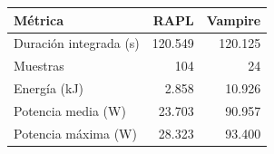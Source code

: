 \begin{tabular}{lrr}
\hline
Métrica & RAPL & Vampire \\
\hline
Duración integrada (s) & 120.549 & 120.125 \\
Muestras & 104 & 24 \\
Energía (kJ) & 2.858 & 10.926 \\
Potencia media (W) & 23.703 & 90.957 \\
Potencia máxima (W) & 28.323 & 93.400 \\
\hline
\end{tabular}
